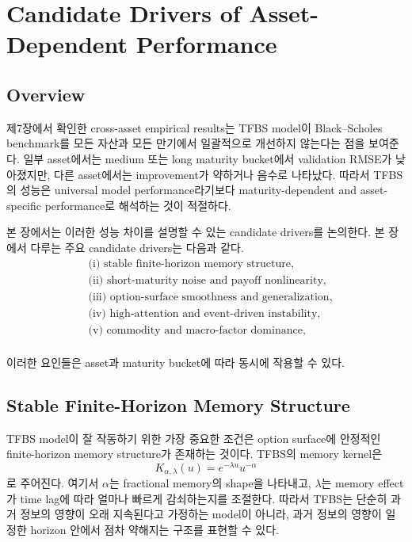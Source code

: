 \documentclass[11pt,a4paper]{report}
\begin{document}
\chapter{Candidate Drivers of Asset-Dependent Performance}

\section{Overview}

제7장에서 확인한 cross-asset empirical results는 TFBS model이 Black--Scholes benchmark를 모든 자산과 모든 만기에서 일괄적으로 개선하지 않는다는 점을 보여준다. 일부 asset에서는 medium 또는 long maturity bucket에서 validation RMSE가 낮아졌지만, 다른 asset에서는 improvement가 약하거나 음수로 나타났다. 따라서 TFBS의 성능은 universal model performance라기보다 maturity-dependent and asset-specific performance로 해석하는 것이 적절하다.

본 장에서는 이러한 성능 차이를 설명할 수 있는 candidate drivers를 논의한다. 본 장에서 다루는 주요 candidate drivers는 다음과 같다.
\[
\begin{aligned}
&\text{(i) stable finite-horizon memory structure},\\
&\text{(ii) short-maturity noise and payoff nonlinearity},\\
&\text{(iii) option-surface smoothness and generalization},\\
&\text{(iv) high-attention and event-driven instability},\\
&\text{(v) commodity and macro-factor dominance},\\
\end{aligned}
\]

이러한 요인들은 asset과 maturity bucket에 따라 동시에 작용할 수 있다.

\section{Stable Finite-Horizon Memory Structure}

TFBS model이 잘 작동하기 위한 가장 중요한 조건은 option surface에 안정적인 finite-horizon memory structure가 존재하는 것이다. TFBS의 memory kernel은
\[
K_{\alpha,\lambda}(u)
=
e^{-\lambda u}u^{-\alpha}
\]
로 주어진다. 여기서 \(\alpha\)는 fractional memory의 shape을 나타내고, \(\lambda\)는 memory effect가 time lag에 따라 얼마나 빠르게 감쇠하는지를 조절한다. 따라서 TFBS는 단순히 과거 정보의 영향이 오래 지속된다고 가정하는 model이 아니라, 과거 정보의 영향이 일정한 horizon 안에서 점차 약해지는 구조를 표현할 수 있다.
\end{document}
